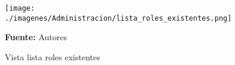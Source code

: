 \begin{figure}[!htb]
  \begin{center}
\texttt{[image: ./imagenes/Administracion/lista\_roles\_existentes.png]}
    \caption{Vista lista roles existentes}
    \label{fig:Vista_lista_roles_existentes}
    \textbf{Fuente:}  Autores
  \end{center}
\end{figure}
